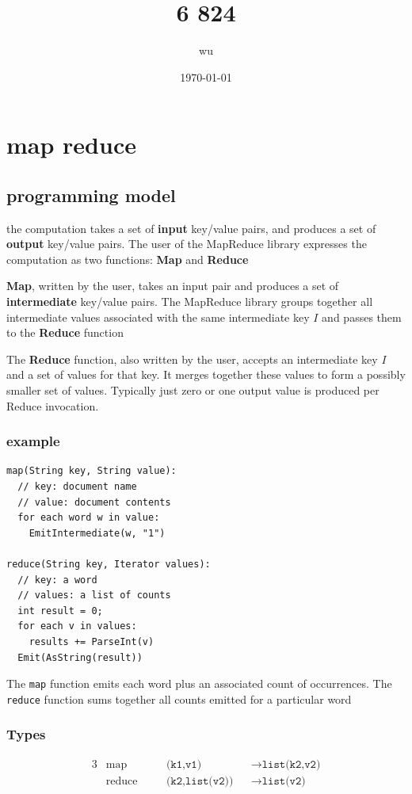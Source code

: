 \documentclass[11pt]{article}
\author{wu}
\date{\today}
\title{6 824}
\begin{document}
\maketitle
\tableofcontents


\section{map reduce}
\label{sec:org236059c}

\subsection{programming model}
\label{sec:org45c4afd}
the computation takes a set of \textbf{input} key/value pairs, and produces a set of \textbf{output} key/value
pairs. The user of the MapReduce library expresses the computation as two functions: \textbf{Map} and
\textbf{Reduce}

\textbf{Map}, written by the user, takes an input pair and produces a set of \textbf{intermediate} key/value
pairs. The MapReduce library groups together all intermediate values associated with the same
intermediate key \(I\) and passes them to the \textbf{Reduce} function

The \textbf{Reduce} function, also written by the user, accepts an intermediate key \(I\)  and a set of
values for that key. It merges together these values to form a possibly smaller set of values.
Typically just zero or one output value is produced per Reduce invocation.

\subsubsection{example}
\label{sec:orgbb4932d}
\begin{verbatim}
map(String key, String value):
  // key: document name
  // value: document contents
  for each word w in value:
    EmitIntermediate(w, "1")

reduce(String key, Iterator values):
  // key: a word
  // values: a list of counts
  int result = 0;
  for each v in values:
    results += ParseInt(v)
  Emit(AsString(result))
\end{verbatim}
The \texttt{map} function emits each word plus an associated count of occurrences. The \texttt{reduce} function
sums together all counts emitted for a particular word

\subsubsection{Types}
\label{sec:org08c98b3}
\begin{alignat*}{3}
&\text{map}&&\texttt{(k1,v1)}&&\to\texttt{list(k2,v2)}\\
&\text{reduce}\quad&&\texttt{(k2,list(v2))}&&\to\texttt{list(v2)}\\
\end{alignat*}
\end{document}
